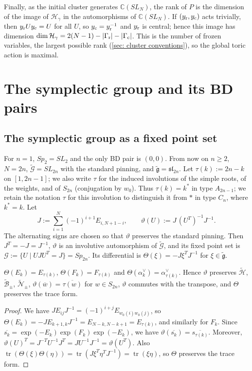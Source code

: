 \documentclass[a4paper]{amsart}
\numberwithin{equation}{section}
\theoremstyle{definition}
\theoremstyle{remark}
\newcommand{\bbC}{\mathbb{C}}
\newcommand{\mfg}{\mathfrak{g}}
\newcommand{\mcG}{\mathcal{G}}
\newcommand{\mcH}{\mathcal{H}}
\newcommand{\mcN}{\mathcal{N}}
\newcommand{\mcB}{\mathcal{B}}
\newcommand{\tG}{\widetilde{\mcG}}
\newcommand{\vt}{\vartheta}
\newcommand{\Vt}{\Theta}
\newcommand{\rr}{{\rm r}}
\newcommand{\cc}{{\rm c}}
\newcommand{\Sp}{Sp_{2n}}
\newcommand{\SL}{SL_{2n}}
\begin{document}
Finally, as the initial cluster generates $\bbC(SL_N)$, the rank of $P$ is the dimension of the image of $\mcH_\gamma$ in the automorphisms of $\bbC(SL_N)$.
If $(y_{\rr},y_{\cc})$ acts trivially, then $y_{\rr}Uy_{\cc}=U$ for all $U$, so $y_{\cc}=y_{\rr}^{-1}$ and $y_{\rr}$ is central; hence this image has dimension $\dim\mcH_\gamma=2(N-1)-|\Gamma_{\rr}|-|\Gamma_{\cc}|$.
This is the number of frozen variables, the largest possible rank (\cref{sec: cluster conventions}), so the global toric action is maximal.

\section{The symplectic group and its BD pairs}
\label{sec: lift}
\subsection{The symplectic group as a fixed point set}
\label{sec: Sp}
For $n=1$, $Sp_2=SL_2$ and the only BD pair is $(0,0)$. From now on $n\ge2$, $N=2n$, $\tG=\SL$ with the standard pinning, and $\widetilde{\mfg}=\mathfrak{sl}_{2n}$.
Let $\tau(k):=2n-k$ on $[1,2n-1]$; we also write $\tau$ for the induced involutions of the simple roots, of the weights, and of $S_{2n}$ (conjugation by $w_0$).
Thus $\tau(k)=k^*$ in type $A_{2n-1}$; we retain the notation $\tau$ for this involution to distinguish it from $*$ in type $C_n$, where $k^*=k$.
Let
\[
  J:=\sum_{i=1}^{N}(-1)^{i+1}E_{i,N+1-i},
  \qquad
  \vt(U):=J\,(U^T)^{-1}J^{-1}.
\]
The alternating signs are chosen so that $\vt$ preserves the standard pinning.
Then $J^T=-J=J^{-1}$, $\vt$ is an involutive automorphism of $\tG$, and its fixed point set is $\mcG:=\{U\mid UJU^T=J\}=\Sp$.
Its differential is $\Vt(\xi)=-J\xi^TJ^{-1}$ for $\xi\in\widetilde{\mfg}$.

\begin{lemma}
  \label{lem: pinning}
  $\Vt(E_k)=E_{\tau(k)}$, $\Vt(F_k)=F_{\tau(k)}$ and $\Vt(\alpha_k^\vee)=\alpha_{\tau(k)}^\vee$.
  Hence $\vt$ preserves $\widetilde{\mcH}$, $\widetilde{\mcB}_\pm$, $\widetilde{\mcN}_\pm$, $\vt(\overline{w})=\overline{\tau(w)}$ for $w\in S_{2n}$, $\vt$ commutes with the transpose, and $\Vt$ preserves the trace form.
\end{lemma}
\begin{proof}
  We have $JE_{ij}J^{-1}=(-1)^{i+j}E_{w_0(i)w_0(j)}$, so $\Vt(E_k)=-JE_{k+1,k}J^{-1}=E_{N-k,N-k+1}=E_{\tau(k)}$, and similarly for $F_k$.
  Since $\overline{s_k}=\exp(-E_k)\exp(F_k)\exp(-E_k)$, we have $\vt(\overline{s_k})=\overline{s_{\tau(k)}}$.
  Moreover, $\vt(U)^T=J^{-T}U^{-1}J^T=JU^{-1}J^{-1}=\vt(U^T)$.
  Also $\operatorname{tr}(\Vt(\xi)\Vt(\eta))=\operatorname{tr}(J\xi^T\eta^TJ^{-1})=\operatorname{tr}(\xi\eta)$, so $\Vt$ preserves the trace form.
\end{proof}
\end{document}
